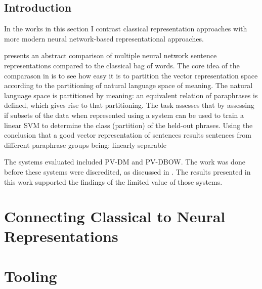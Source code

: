 \documentclass{book}
\begin{document}
\chapter{Introduction}
In the works in this section I contrast classical representation approaches with more modern neural network-based representational approaches.

 presents an abstract comparison of multiple neural network sentence representations compared to the classical bag of words.
The core idea of the comparason in  is to see how easy it is to partition the vector representation space according to the partitioning of natural language space of meaning.
The natural language space is partitioned by meaning: an equivalent relation of paraphrases is defined, which gives rise to that partitioning.
The task assesses that by assessing if subsets of the data when represented using a system can be used to train a linear SVM to determine the class (partition) of the held-out phrases.
Using the conclusion that a good vector representation of sentences results sentences from different paraphrase groups being:
linearly separable



The systems evaluated included PV-DM and PV-DBOW.
The work was done before these systems were discredited, 
as discussed in .
The results presented in this work supported the findings of the limited value of those systems.




\label{SentVecMeaning}






\part{Connecting Classical to Neural Representations}




\part{Tooling}
\end{document}
